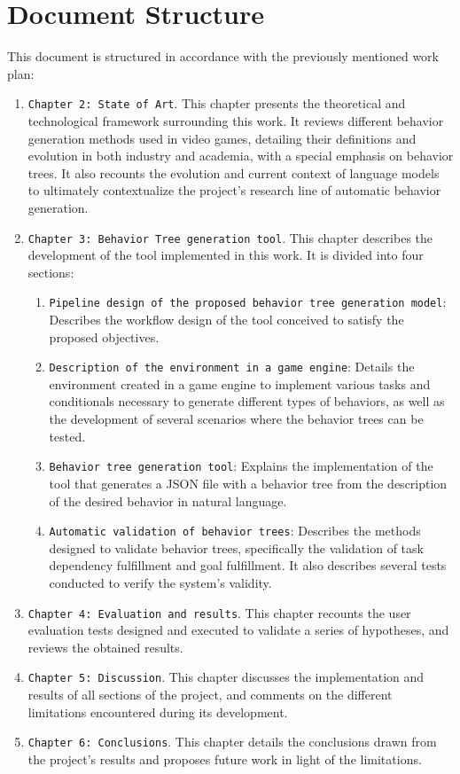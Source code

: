 \section{Document Structure}
This document is structured in accordance with the previously mentioned work plan:

\begin{enumerate}
	\item \texttt{Chapter 2: State of Art}. This chapter presents the theoretical and technological framework surrounding this work.
	It reviews different behavior generation methods used in video games, detailing their definitions and evolution in both industry and academia, with a special emphasis on behavior trees.
	It also recounts the evolution and current context of language models to ultimately contextualize the project's research line of automatic behavior generation.
	\item \texttt{Chapter 3: Behavior Tree generation tool}. This chapter describes the development of the tool implemented in this work.
	It is divided into four sections:
	\begin{enumerate}
		\item \texttt{Pipeline design of the proposed behavior tree generation model}: Describes the workflow design of the tool conceived to satisfy the proposed objectives.
		\item \texttt{Description of the environment in a game engine}: Details the environment created in a game engine to implement various tasks and conditionals necessary to generate different types of behaviors, as well as the development of several scenarios where the behavior trees can be tested.
		\item \texttt{Behavior tree generation tool}: Explains the implementation of the tool that generates a JSON file with a behavior tree from the description of the desired behavior in natural language.
		\item \texttt{Automatic validation of behavior trees}: Describes the methods designed to validate behavior trees, specifically the validation of task dependency fulfillment and goal fulfillment.
		It also describes several tests conducted to verify the system's validity.
	\end{enumerate}
	\item \texttt{Chapter 4: Evaluation and results}. This chapter recounts the user evaluation tests designed and executed to validate a series of hypotheses, and reviews the obtained results.
	\item \texttt{Chapter 5: Discussion}. This chapter discusses the implementation and results of all sections of the project, and comments on the different limitations encountered during its development.
	\item \texttt{Chapter 6: Conclusions}. This chapter details the conclusions drawn from the project's results and proposes future work in light of the limitations.
\end{enumerate}

